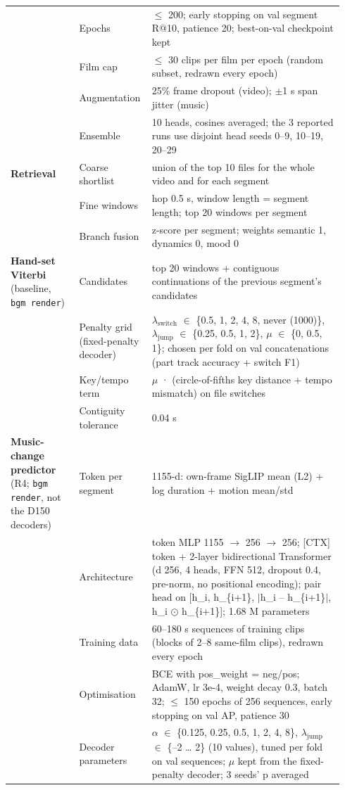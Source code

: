 \begin{longtable}{@{}p{0.2\linewidth}p{0.18\linewidth}p{0.56\linewidth}@{}}
 & Epochs & $\le$ 200; early stopping on val segment R@10, patience 20; best-on-val checkpoint kept\\
 & Film cap & $\le$ 30 clips per film per epoch (random subset, redrawn every epoch)\\
 & Augmentation & 25\% frame dropout (video); $\pm$1 s span jitter (music)\\
 & Ensemble & 10 heads, cosines averaged; the 3 reported runs use disjoint head seeds 0--9, 10--19, 20--29\\
\midrule
\textbf{Retrieval} & Coarse shortlist & union of the top 10 files for the whole video and for each segment\\
 & Fine windows & hop 0.5 s, window length = segment length; top 20 windows per segment\\
 & Branch fusion & z-score per segment; weights semantic 1, dynamics 0, mood 0\\
\midrule
\textbf{Hand-set Viterbi} (baseline, \texttt{bgm render}) & Candidates & top 20 windows + contiguous continuations of the previous segment's candidates\\
 & Penalty grid (fixed-penalty decoder) & $\lambda_{\mathrm{switch}}$ $\in$ \{0.5, 1, 2, 4, 8, never (1000)\}, $\lambda_{\mathrm{jump}}$ $\in$ \{0.25, 0.5, 1, 2\}, $\mu$ $\in$ \{0, 0.5, 1\}; chosen per fold on val concatenations (part track accuracy + switch F1)\\
 & Key/tempo term & $\mu$ · (circle-of-fifths key distance + tempo mismatch) on file switches\\
 & Contiguity tolerance & 0.04 s\\
\midrule
\textbf{Music-change predictor} (R4; \texttt{bgm render}, not the D150 decoders) & Token per segment & 1155-d: own-frame SigLIP mean (L2) + log duration + motion mean/std\\
 & Architecture & token MLP 1155 $\rightarrow$ 256 $\rightarrow$ 256; [CTX] token + 2-layer bidirectional Transformer (d 256, 4 heads, FFN 512, dropout 0.4, pre-norm, no positional encoding); pair head on [h\_i, h\_\{i+1\}, $|$h\_i -- h\_\{i+1\}$|$, h\_i $\odot$ h\_\{i+1\}]; 1.68 M parameters\\
 & Training data & 60--180 s sequences of training clips (blocks of 2--8 same-film clips), redrawn every epoch\\
 & Optimisation & BCE with pos\_weight = neg/pos; AdamW, lr 3e-4, weight decay 0.3, batch 32; $\le$ 150 epochs of 256 sequences, early stopping on val AP, patience 30\\
 & Decoder parameters & $\alpha$ $\in$ \{0.125, 0.25, 0.5, 1, 2, 4, 8\}, $\lambda_{\mathrm{jump}}$ $\in$ \{--2 \ldots{} 2\} (10 values), tuned per fold on val sequences; $\mu$ kept from the fixed-penalty decoder; 3 seeds' p averaged\\

\end{longtable}
